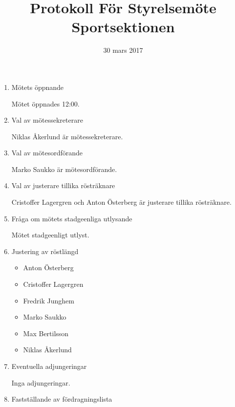 \documentclass[12pt,a4paper]{article}
\begin{document}
	\title{\Huge Protokoll För Styrelsemöte Sportsektionen}
	\date{30 mars 2017}
	\maketitle

	\null
	\vfill

	\clearpage

	\begin{enumerate}

		\item Mötets öppnande
		
			Mötet öppnades 12:00.
			
		\item Val av mötessekreterare
		
			Niklas Åkerlund är mötessekreterare.
			
		\item Val av mötesordförande
		
			Marko Saukko är mötesordförande.
			
		\item Val av justerare tillika rösträknare
		
			Cristoffer Lagergren och Anton Österberg är justerare tillika rösträknare.
			
		\item Fråga om mötets stadgeenliga utlysande
		
			Mötet stadgeenligt utlyst.
			
		\item Justering av röstlängd
		
			\begin{itemize}
				\item Anton Österberg
				\item Cristoffer Lagergren
				\item Fredrik Junghem
				\item Marko Saukko
				\item Max Bertilsson
				\item Niklas Åkerlund
			\end{itemize}
				
		\item Eventuella adjungeringar
		
			Inga adjungeringar.
			
		\item Fastställande av fördragningslista
		

\end{enumerate}
\end{document}
